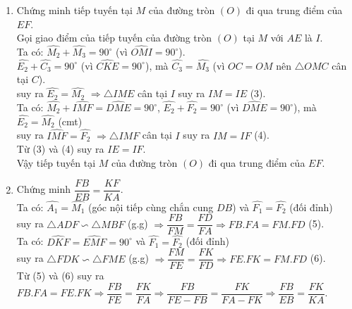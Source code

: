 \begin{ex}
{\begin{enumerate}
{ 
}
Lại có: $\widehat{DAC}=90^\circ$ (góc nội tiếp chắn nửa đường tròn); $\widehat{AKC}=90^\circ$\\
$\Rightarrow \triangle ACD$ vuông tại $A$ có đường cao $AK$ nên $AK^2=DK.CD$ (2).\\
Từ (1) và (2) suy ra $DF.DM=AD^2$.
\item Chứng minh tiếp tuyến tại $M$ của đường tròn $(O)$ đi qua trung điểm của $EF$. \\
Gọi giao điểm của tiếp tuyến của đường tròn $(O)$ tại $M$ với $AE$ là $I$.\\
Ta có: $\widehat{M_2}+\widehat{M_3}=90^\circ$ (vì $\widehat{OMI}=90^\circ$).\\
$\widehat{E_2}+\widehat{C_3}=90^\circ$ (vì $\widehat{CKE}=90^\circ$), mà $\widehat{C_3}=\widehat{M_3}$ (vì $OC=OM$ nên $\triangle OMC$ cân tại $C$).\\
suy ra $\widehat{E_2}=\widehat{M_2}$ $\Rightarrow \triangle IME$ cân tại $I$ suy ra $IM=IE$ (3).\\
Ta có: $\widehat{M_2}+\widehat{IMF}=\widehat{DME}=90^\circ$, $\widehat{E_2}+\widehat{F_2}=90^\circ$ (vì $\widehat{DME}=90^\circ$), mà $\widehat{E_2}=\widehat{M_2}$ (cmt)\\
suy ra $\widehat{IMF}=\widehat{F_2}$ $\Rightarrow \triangle IMF$ cân tại $I$ suy ra $IM=IF$ (4).\\
Từ (3) và (4) suy ra $IE=IF$.\\
Vậy tiếp tuyến tại $M$ của đường tròn $(O)$ đi qua trung điểm của $EF$.
\item Chứng minh $\dfrac{FB}{EB}=\dfrac{KF}{KA}$.\\
Ta có: $\widehat{A_1}=\widehat{M_1}$ (góc nội tiếp cùng chắn cung $DB$) và $\widehat{F_1}=\widehat{F_2}$ (đối đỉnh)\\
suy ra $\triangle ADF \backsim \triangle MBF$ (g.g) $\Rightarrow \dfrac{FB}{FM}=\dfrac{FD}{FA} \Rightarrow FB.FA=FM.FD$ (5).\\
Ta có: $\widehat{DKF}=\widehat{EMF}=90^\circ$ và $\widehat{F_1}=\widehat{F_2}$ (đối đỉnh)\\
suy ra $\triangle FDK \backsim \triangle FME$ (g.g) $\Rightarrow \dfrac{FM}{FE}=\dfrac{FK}{FD} \Rightarrow FE.FK=FM.FD$ (6).\\
Từ (5) và (6) suy ra \\
$FB.FA=FE.FK \Rightarrow \dfrac{FB}{FE}=\dfrac{FK}{FA} \Rightarrow \dfrac{FB}{FE-FB}=\dfrac{FK}{FA-FK} \Rightarrow \dfrac{FB}{EB}=\dfrac{FK}{KA}.$
\end{enumerate}
	}
\end{ex}


